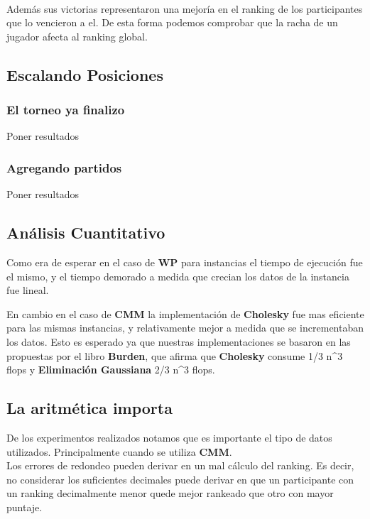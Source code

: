 \\
Además sus victorias representaron una mejoría en el ranking de los participantes que lo vencieron a el. De esta forma podemos comprobar que la racha de un jugador afecta al ranking global.\\


\subsection{Escalando Posiciones}

\subsubsection{El torneo ya finalizo}

Poner resultados


\subsubsection{Agregando partidos}

Poner resultados



\subsection{Análisis Cuantitativo}

Como era de esperar en el caso de \textbf{WP} para instancias el tiempo de ejecución fue el mismo, y el tiempo demorado a medida que crecian los datos de la instancia fue lineal.

En cambio en el caso de \textbf{CMM} la implementación de \textbf{Cholesky} fue mas eficiente para las mismas instancias, y relativamente mejor a medida que se incrementaban los datos. 
Esto es esperado ya que nuestras implementaciones se basaron en las propuestas por el libro \textbf{Burden}, que afirma que \textbf{Cholesky} consume 1/3 {n^3} flops y \textbf{Eliminación Gaussiana} 2/3 {n^3} flops.


\subsection{La aritmética importa}

De los experimentos realizados notamos que es importante el tipo de datos utilizados. Principalmente cuando se utiliza \textbf{CMM}.
\\

Los errores de redondeo pueden derivar en un mal cálculo del ranking. Es decir, no considerar los suficientes decimales puede derivar en que un participante con un ranking
decimalmente menor quede mejor rankeado que otro con mayor puntaje.\\

